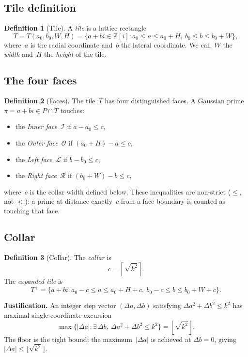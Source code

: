 \documentclass[11pt,a4paper]{article}
\newcommand{\Zi}{\mathbb{Z}[i]}
\newcommand{\fI}{\mathcal{I}}
\newcommand{\fO}{\mathcal{O}}
\newcommand{\fL}{\mathcal{L}}
\newcommand{\fR}{\mathcal{R}}
\newcommand{\Tplus}{T^+}
\theoremstyle{definition}
\newtheorem{definition}{Definition}[section]
\theoremstyle{plain}
\theoremstyle{remark}
\begin{document}
\subsection{Tile definition}

\begin{definition}[Tile]\label{def:tile}
A \emph{tile} is a lattice rectangle
\[
  T = T(a_0, b_0, W, H) = \{a + bi \in \Zi : a_0 \le a \le a_0 + H,\ b_0 \le b \le b_0 + W\},
\]
where~$a$ is the radial coordinate and~$b$ the lateral coordinate.  We call~$W$ the \emph{width} and~$H$ the \emph{height} of the tile.
\end{definition}

\subsection{The four faces}

\begin{definition}[Faces]\label{def:faces}
The tile~$T$ has four distinguished faces.  A Gaussian prime $\pi = a + bi \in P \cap T$ touches:
\begin{itemize}
  \item the \emph{Inner face}~$\fI$ if $a - a_0 \le c$,
  \item the \emph{Outer face}~$\fO$ if $(a_0 + H) - a \le c$,
  \item the \emph{Left face}~$\fL$ if $b - b_0 \le c$,
  \item the \emph{Right face}~$\fR$ if $(b_0 + W) - b \le c$,
\end{itemize}
where~$c$ is the collar width defined below.  These inequalities are non-strict ($\le$, not $<$): a prime at distance exactly~$c$ from a face boundary is counted as touching that face.
\end{definition}

\subsection{Collar}

\begin{definition}[Collar]\label{def:collar}
The \emph{collar} is
\[
  c = \left\lceil \sqrt{k^2} \right\rceil.
\]
The \emph{expanded tile} is
\[
  \Tplus = \{a + bi : a_0 - c \le a \le a_0 + H + c,\ b_0 - c \le b \le b_0 + W + c\}.
\]
\end{definition}

\noindent\textbf{Justification.}  An integer step vector $(\Delta a, \Delta b)$ satisfying $\Delta a^2 + \Delta b^2 \le k^2$ has maximal single-coordinate excursion
\[
  \max\{|\Delta a| : \exists\,\Delta b,\ \Delta a^2 + \Delta b^2 \le k^2\} = \left\lfloor \sqrt{k^2} \right\rfloor.
\]
The floor is the tight bound: the maximum~$|\Delta a|$ is achieved at $\Delta b = 0$, giving $|\Delta a| \le \lfloor\sqrt{k^2}\rfloor$.
\end{document}
